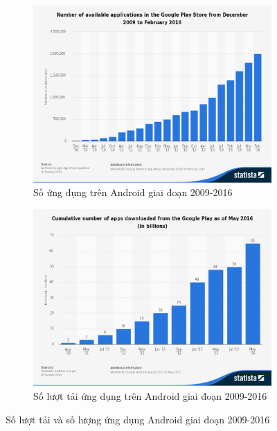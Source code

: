 \documentclass[a4paper]{article}
\begin{document}
\begin{figure}[h]
\centering
\begin{subfigure}{.5\textwidth}
  \centering
  \includegraphics[width=0.9\linewidth]{number_app.png}
  \caption{Số ứng dụng trên Android giai đoạn 2009-2016}
\end{subfigure}
\begin{subfigure}{.5\textwidth}
  \centering
  \includegraphics[width=0.9\linewidth]{number_app_downloads.PNG}
  \caption{Số lượt tải ứng dụng trên Android giai đoạn 2009-2016}
  \label{fig:sub2}
\end{subfigure}
\caption{Số lượt tải và số lượng ứng dụng Android giai đoạn 2009-2016}
\end{figure} 
\end{document}
